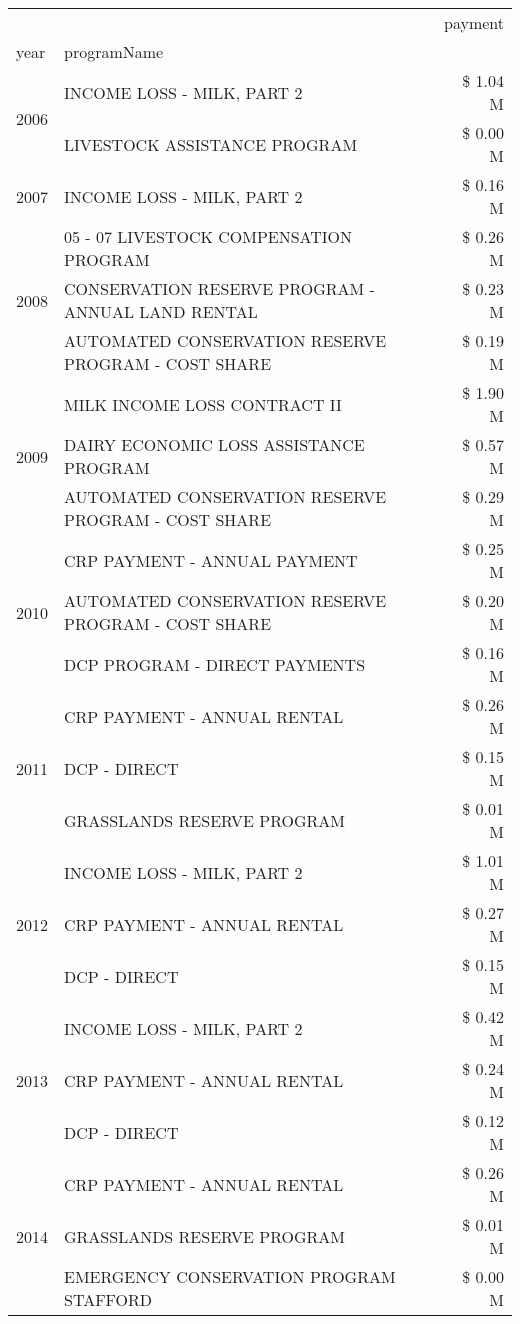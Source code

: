 \begin{tabular}{llr}
\toprule
 &  & payment \\
year & programName &  \\
\midrule
\multirow[t]{2}{*}{2006} & INCOME LOSS - MILK, PART 2 & \$ 1.04 M \\
 & LIVESTOCK ASSISTANCE PROGRAM & \$ 0.00 M \\
\cline{1-3}
2007 & INCOME LOSS - MILK, PART 2 & \$ 0.16 M \\
\cline{1-3}
\multirow[t]{3}{*}{2008} & 05 - 07 LIVESTOCK COMPENSATION PROGRAM & \$ 0.26 M \\
 & CONSERVATION RESERVE PROGRAM - ANNUAL LAND RENTAL & \$ 0.23 M \\
 & AUTOMATED CONSERVATION RESERVE PROGRAM - COST SHARE & \$ 0.19 M \\
\cline{1-3}
\multirow[t]{3}{*}{2009} & MILK INCOME LOSS CONTRACT II & \$ 1.90 M \\
 & DAIRY ECONOMIC LOSS ASSISTANCE PROGRAM & \$ 0.57 M \\
 & AUTOMATED CONSERVATION RESERVE PROGRAM - COST SHARE & \$ 0.29 M \\
\cline{1-3}
\multirow[t]{3}{*}{2010} & CRP PAYMENT - ANNUAL PAYMENT & \$ 0.25 M \\
 & AUTOMATED CONSERVATION RESERVE PROGRAM - COST SHARE & \$ 0.20 M \\
 & DCP PROGRAM - DIRECT PAYMENTS & \$ 0.16 M \\
\cline{1-3}
\multirow[t]{3}{*}{2011} & CRP PAYMENT - ANNUAL RENTAL & \$ 0.26 M \\
 & DCP - DIRECT & \$ 0.15 M \\
 & GRASSLANDS RESERVE PROGRAM & \$ 0.01 M \\
\cline{1-3}
\multirow[t]{3}{*}{2012} & INCOME LOSS - MILK, PART 2 & \$ 1.01 M \\
 & CRP PAYMENT - ANNUAL RENTAL & \$ 0.27 M \\
 & DCP - DIRECT & \$ 0.15 M \\
\cline{1-3}
\multirow[t]{3}{*}{2013} & INCOME LOSS - MILK, PART 2 & \$ 0.42 M \\
 & CRP PAYMENT - ANNUAL RENTAL & \$ 0.24 M \\
 & DCP - DIRECT & \$ 0.12 M \\
\cline{1-3}
\multirow[t]{3}{*}{2014} & CRP PAYMENT - ANNUAL RENTAL & \$ 0.26 M \\
 & GRASSLANDS RESERVE PROGRAM & \$ 0.01 M \\
 & EMERGENCY CONSERVATION PROGRAM STAFFORD & \$ 0.00 M \\

\end{tabular}
